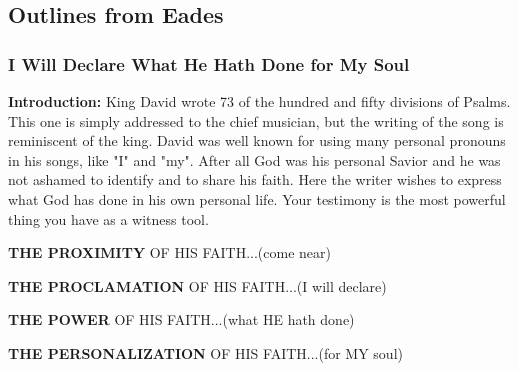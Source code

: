 \subsection{Outlines from Eades}

\subsubsection{I Will Declare What He Hath Done for My Soul}

\textbf{Introduction:} King David wrote 73 of the hundred and fifty divisions of Psalms. This one is simply addressed to the chief musician, but the writing of the song is reminiscent of the king.  David was well known for using many personal pronouns in his songs, like "I" and "my". After all God was his personal Savior and he was not ashamed to identify and to share his faith.  Here the writer wishes to express what God has done in his own personal life. Your testimony is the most powerful thing you have as a witness tool.
\begin{compactenum}[I.][4]
    \item \textbf{THE PROXIMITY} OF HIS FAITH...(come near)
    \item \textbf{THE PROCLAMATION} OF HIS FAITH...(I will declare)
    \item \textbf{THE POWER} OF HIS FAITH...(what HE hath done)
    \item \textbf{THE PERSONALIZATION} OF HIS FAITH...(for MY soul)
\end{compactenum}